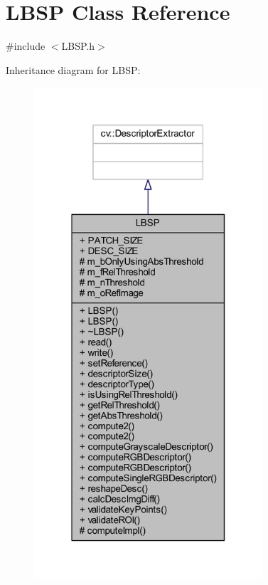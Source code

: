 \hypertarget{class_l_b_s_p}{}\section{L\+B\+SP Class Reference}
\label{class_l_b_s_p}


{\ttfamily \#include $<$L\+B\+S\+P.\+h$>$}



Inheritance diagram for L\+B\+SP\+:\nopagebreak
\begin{figure}[H]
\begin{center}
\leavevmode
\includegraphics[width=241pt]{class_l_b_s_p__inherit__graph}
\end{center}
\end{figure}


